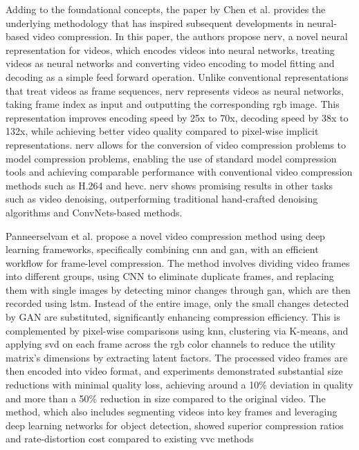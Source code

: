 Adding to the foundational concepts, the paper by Chen et al. \cite{chen2021nerv} provides the underlying methodology that has inspired subsequent developments in neural-based video compression. In this paper, the authors propose \gls{nerv}, a novel neural representation for videos, which encodes videos into neural networks, treating videos as neural networks and converting video encoding to model fitting and decoding as a simple feed forward operation. Unlike conventional representations that treat videos as frame sequences, \gls{nerv} represents videos as neural networks, taking frame index as input and outputting the corresponding \gls{rgb} image. This representation improves encoding speed by 25x to 70x, decoding speed by 38x to 132x, while achieving better video quality compared to pixel-wise implicit representations. \gls{nerv} allows for the conversion of video compression problems to model compression problems, enabling the use of standard model compression tools and achieving comparable performance with conventional video compression methods such as H.264 and \gls{hevc}. \gls{nerv} shows promising results in other tasks such as video denoising, outperforming traditional hand-crafted denoising algorithms and ConvNets-based methods.

Panneerselvam et al. \cite{paneerselvam_effective} propose a novel video compression method using deep learning frameworks, specifically combining \gls{cnn} and \gls{gan}, with an efficient workflow for frame-level compression. The method involves dividing video frames into different groups, using CNN to eliminate duplicate frames, and replacing them with single images by detecting minor changes through \gls{gan}, which are then recorded using \gls{lstm}. Instead of the entire image, only the small changes detected by GAN are substituted, significantly enhancing compression efficiency. This is complemented by pixel-wise comparisons using \gls{knn}, clustering via K-means, and applying \gls{svd} on each frame across the \gls{rgb} color channels to reduce the utility matrix's dimensions by extracting latent factors. The processed video frames are then encoded into video format, and experiments demonstrated substantial size reductions with minimal quality loss, achieving around a 10\% deviation in quality and more than a 50\% reduction in size compared to the original video. The method, which also includes segmenting videos into key frames and leveraging deep learning networks for object detection, showed superior compression ratios and rate-distortion cost compared to existing \gls{vvc} methods

